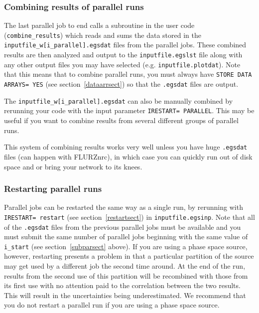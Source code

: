 \documentclass[12pt,twoside]{article}  %
\begin{document}
\subsubsection{Combining results of parallel runs}

The last parallel job to end calls a subroutine in the user code
({\tt combine\_results})
which reads and sums the data stored in the
{\tt inputfile\_w[i\_parallel].egsdat} files from the parallel jobs.
These combined results are then analyzed and output
to the {\tt inputfile.egslst} file along with any other output files 
you may have selected (e.g. {\tt inputfile.plotdat}).  Note that this
means that to combine parallel runs, you must always have
{\tt STORE DATA ARRAYS= YES} (see section~\ref{dataarrsect}) so that
the {\tt .egsdat} files are output.  

The {\tt inputfile\_w[i\_parallel].egsdat} can also be manually combined
by rerunning your code with the input parameter
\verb+IRESTART= PARALLEL+.  This may be useful if you want to combine
results from several different groups of parallel runs.

This system of combining results works very well unless you have 
huge {\tt .egsdat}
files (can happen with FLURZnrc), in which case you can quickly run out of
disk space and or bring your network to its knees.

\subsubsection{Restarting parallel runs}

Parallel jobs can be restarted the same way as a single run, by
rerunning with {\tt IRESTART= restart} (see section~\ref{restartsect})
in {\tt inputfile.egsinp}.
Note that all of the {\tt .egsdat} files from the previous parallel
jobs must be available and you must submit the same number of parallel 
jobs beginning with the same value of {\tt i\_start} (see section~\ref{subparsect} above).
If you are using a
phase space source, however, restarting presents a problem in that a
particular partition of the source may get used by a different job the
second time around.  At the end of the run, results from the second
use of this partition will be recombined with those from its first use
with no attention paid to the correlation between the two results.  This
will result in the uncertainties being underestimated.  We recommend that
you do not restart a parallel run if you are using a phase space source.
\end{document}
